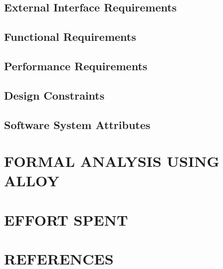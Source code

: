 \documentclass[11pt]{report}
\begin{document}
		\section{External Interface Requirements}
		\label{sect:External Interface Requirements}
			
			
		\section{Functional Requirements}
		\label{sect:Functional Requirements}
			
			
		\section{Performance Requirements}
		\label{sect:Performance Requirements}
			
		\section{Design Constraints}
		\label{sect:Design Constraints}
			
			
		\section{Software System Attributes}
		\label{sect:Software System Attributes}
			
			
	\chapter{FORMAL ANALYSIS USING ALLOY}
	\label{ch:FORMAL ANALYSIS USING ALLOY}
		
	\chapter{EFFORT SPENT}
	\label{ch:EFFORT SPENT}
		
	\chapter{REFERENCES}
	\label{ch:REFERENCES}
\end{document}
